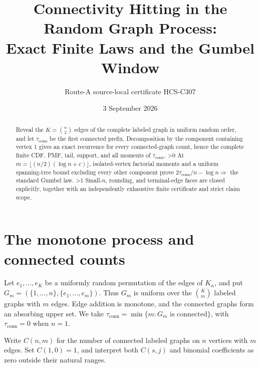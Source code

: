 \documentclass[10pt]{article}
\title{Connectivity Hitting in the Random Graph Process:\\
Exact Finite Laws and the Gumbel Window}
\author{Route-A source-local certificate HCS-C307}
\date{3 September 2026}
\providecommand{\CRevisionRound}{2}
\newcommand{\conn}{\mathrm{conn}}
\begin{document}
\maketitle

\begin{abstract}
Reveal the $K=\binom n2$ edges of the complete labeled graph in uniform random
order, and let $\tau_{\conn}$ be the first connected prefix.  Decomposition by
the component containing vertex 1 gives an exact recurrence for every
connected-graph count, hence the complete finite CDF, PMF, tail, support, and
all moments of $\tau_{\conn}$.
\ifnum\CRevisionRound>0
At $m=\lfloor(n/2)(\log n+c)\rfloor$, isolated-vertex factorial moments and a
uniform spanning-tree bound excluding every other component prove
$2\tau_{\conn}/n-\log n\Rightarrow$ the standard Gumbel law.
\fi
\ifnum\CRevisionRound>1
Small-$n$, rounding, and terminal-edge faces are closed explicitly, together
with an independently exhaustive finite certificate and strict claim scope.
\fi
\end{abstract}

\section{The monotone process and connected counts}
Let $e_1,\ldots,e_K$ be a uniformly random permutation of the edges of
$K_n$, and put $G_m=(\{1,\ldots,n\},\{e_1,\ldots,e_m\})$.  Thus $G_m$ is
uniform over the $\binom Km$ labeled graphs with $m$ edges.  Edge addition is
monotone, and the connected graphs form an absorbing upper set.  We take
$\tau_{\conn}=\min\{m:G_m\text{ is connected}\}$, with $\tau_{\conn}=0$
when $n=1$.

Write $C(n,m)$ for the number of connected labeled graphs on $n$ vertices
with $m$ edges.  Set $C(1,0)=1$, and interpret both $C(s,j)$ and binomial
coefficients as zero outside their natural ranges.
\end{document}
